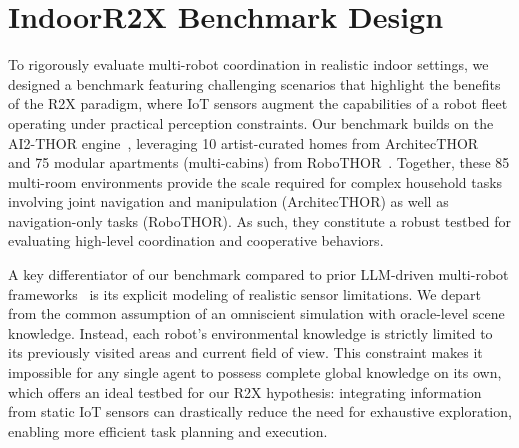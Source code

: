 \section{IndoorR2X Benchmark Design}
\label{sec:benchmark}
To rigorously evaluate multi-robot coordination in realistic indoor settings, we designed a benchmark featuring challenging scenarios that highlight the benefits of the R2X paradigm, where IoT sensors augment the capabilities of a robot fleet operating under practical perception constraints.
Our benchmark builds on the AI2-THOR engine~\cite{ai2thor}, leveraging 10 artist-curated homes from ArchitecTHOR~\cite{procthor} and 75 modular apartments (multi-cabins) from RoboTHOR~\cite{deitke2020robothor}. Together, these 85 multi-room environments provide the scale required for complex household tasks involving joint navigation and manipulation (ArchitecTHOR) as well as navigation-only tasks (RoboTHOR). As such, they constitute a robust testbed for evaluating high-level coordination and cooperative behaviors.


A key differentiator of our benchmark compared to prior LLM-driven multi-robot frameworks~\cite{kannan2024smart, bai2024twostep, chen2025emos} is its explicit modeling of realistic sensor limitations. We depart from the common assumption of an omniscient simulation with oracle-level scene knowledge. Instead, each robot's environmental knowledge is strictly limited to its previously visited areas and current field of view. This constraint makes it impossible for any single agent to possess complete global knowledge on its own, which offers an ideal testbed for our R2X hypothesis: integrating information from static IoT sensors can drastically reduce the need for exhaustive exploration, enabling more efficient task planning and execution.


